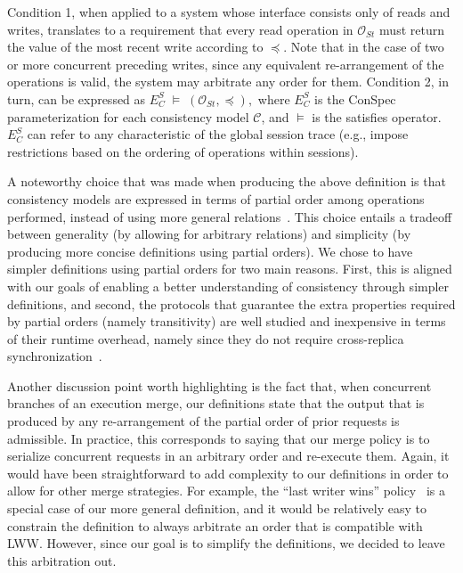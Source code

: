 \documentclass[conference]{IEEEtran}
\begin{document}
	Condition 1, when applied to a system whose interface consists only of reads and writes, translates to a requirement that every read operation in %
	${\mathcal{O}_{St}}$ must return the value of the most recent write according to $\preccurlyeq$. Note that in the case of two or more concurrent preceding writes, since any  equivalent re-arrangement of the operations is valid, the system may arbitrate any order for them.
	Condition 2, in turn, can be expressed as $ E^S_C\; \vDash \; \left( {\mathcal{O}_{St}}, \preccurlyeq \right),$ where %
	$E^S_C$ is the ConSpec parameterization for each
	consistency model $\mathcal{C}$,
	and  $\vDash$ is the satisfies operator. $E^S_C$  can refer to any characteristic of the global session trace (e.g., impose restrictions based on the ordering of operations within sessions).
	\par A noteworthy choice that was made when producing the above definition is that consistency models are expressed in terms of  partial order among operations performed, instead of using more general relations~\cite{Burckhardt:2014:PEC:2693641.2693642}. This choice entails a tradeoff between generality (by allowing for arbitrary relations) and simplicity (by producing more concise definitions using partial orders). We chose to have simpler definitions using partial orders for two main reasons. First, this is aligned with our goals of enabling a better understanding of consistency through simpler definitions, and second, the protocols that guarantee the extra properties required by partial orders (namely transitivity) are well studied and inexpensive in terms of their runtime overhead, namely since they do not require cross-replica synchronization~\cite{Bailis:2013:BCC:2463676.2465279,Lloyd:2011:DSE:2043556.2043593}.
	
	Another discussion point worth highlighting is the fact that, when concurrent branches of an execution merge, our definitions state that the output that is produced by any re-arrangement of the partial order of prior requests is admissible. In practice, this corresponds to saying that our merge policy is to serialize concurrent requests in an arbitrary order and re-execute them. Again, it would have been straightforward to add complexity to our definitions in order to allow for other merge strategies.
	For example, the ``last writer wins'' policy~\cite{lww} is a special case of our more general definition, and it would be relatively easy to constrain the definition to always arbitrate an order that is compatible with LWW. However, since our goal is to simplify the definitions, we decided to leave this arbitration out.
	
\end{document}
